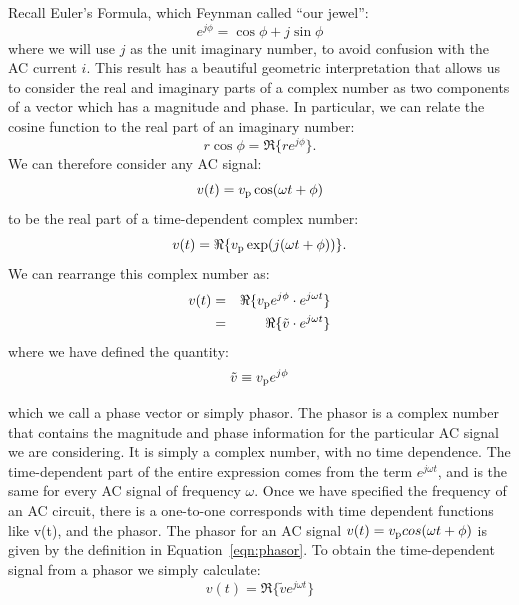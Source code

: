 \documentclass[12pt,oneside]{book}
\begin{document}
Recall Euler's Formula, which Feynman called ``our jewel'':
\begin{displaymath}
e^{j\phi} = \cos \phi + j \sin \phi 
\end{displaymath}
where we will use $j$ as the unit imaginary number, to avoid confusion with the AC current $i$.  This result has a beautiful geometric interpretation that allows us to consider the real and imaginary parts of a complex number as two components of a vector which has a magnitude and phase.  In particular, we can relate the cosine function to the real part of an imaginary number:
\begin{displaymath}
r \cos \phi = \Re \{ r e^{j\phi} \}. 
\end{displaymath}
We can therefore consider any AC signal:
\begin{displaymath}
v(t) = v_{\rm p} \cos ( \omega t + \phi)
\end{displaymath}
to be the real part of a time-dependent complex number:
\begin{displaymath}
v(t) = \Re \{ v_{\rm p} \exp ( j (\omega t + \phi))\}.
\end{displaymath}
We can rearrange this complex number as:
\begin{eqnarray*}
v(t) &=& \Re \{ v_{\rm p} e^{j\phi} \cdot e^{j \omega t} \} \\
&=& \Re \{ \tilde{v} \cdot e^{j \omega t} \} \\
\end{eqnarray*}
where we have defined the quantity:
\begin{equation}
\tilde{v} \equiv v_{\rm p} e^{j \phi}
\label{eqn:phasor}
\end{equation}

which we call a phase vector or simply phasor.  The phasor is a complex number that contains the magnitude and phase information for the particular AC signal we are considering.  It is simply a complex number, with no time dependence.  The time-dependent part of the entire expression comes from the term $e^{j \omega t}$, and is the same for every AC signal of frequency $\omega$.  Once we have specified the frequency of an AC circuit, there is a one-to-one corresponds with time dependent functions like v(t), and the phasor.  The phasor for an AC signal $v(t) = v_{\rm p} cos(\omega t + \phi)$ is given by the definition in Equation~\ref{eqn:phasor}.  To obtain the time-dependent signal from a phasor we simply calculate:
\begin{equation}
v(t) = \Re \{ \tilde{v} e^{j \omega t} \}
\end{equation}
\end{document}
